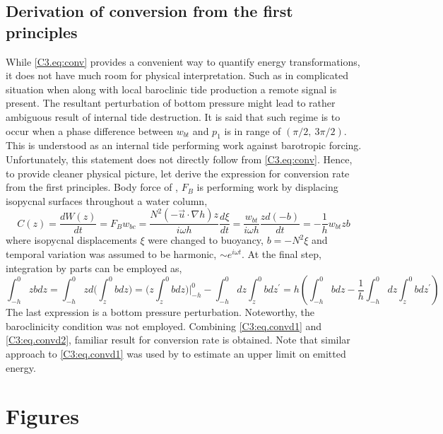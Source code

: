\documentclass[12pt]{article}
\begin{document}
\subsection{Derivation of conversion from the first principles}
\label{C3.app:B}
While \eqref{C3.eq:conv} provides a convenient way to quantify energy transformations, it does 
not have much room for physical interpretation. Such as in complicated situation when along with 
local baroclinic tide production a remote signal is present. The resultant perturbation of bottom 
pressure might lead to rather ambiguous result of internal tide destruction. It is said that such 
regime is to occur when a phase difference between $w_{bt}$ and $p_{1}$ is in range of 
$(\pi/2,~3\pi/2)$. This is understood as an internal tide performing work against barotropic 
forcing. Unfortunately, this statement does not directly follow from \eqref{C3.eq:conv}. Hence, to 
provide cleaner physical picture, let derive the expression for conversion rate from the first 
principles. Body force of \citep{baines1982internal}, $F_B$ is performing work by displacing 
isopycnal 
surfaces throughout a water column,
\begin{equation}
\label{C3:eq.convd1}
C(z) = \frac{dW(z)}{dt} = F_{B} w_{bc} = \frac{N^2 (-\vec{u} \cdot \nabla h) z}{i \omega h} 
\frac{d 
\xi}{dt} = \frac{w_{bt}}{i \omega h} \frac{z d(-b)}{dt} = -\frac{1}{h} w_{bt} zb
\end{equation}
where isopycnal displacements $\xi$ were changed to buoyancy, $b = -N^2 \xi$ and temporal 
variation 
was assumed to be harmonic, $\sim e^{i \omega t}$. At the final step, integration by parts can be 
employed as,
\begin{equation}
\label{C3:eq.convd2}
\int_{-h}^{0} z b dz = \int_{-h}^{0} z d \big( \int^0_{z} b dz \big) = \big( z \int^0_{z} b dz 
\big)\big|_{-h}^0 - \int_{-h}^{0} dz \int_{z}^{0} b dz^{\prime} = h (\int_{-h}^{0}b dz - 
\frac{1}{h} \int_{-h}^{0} dz \int_{z}^{0} b dz^{\prime})
\end{equation}
The last expression is a bottom pressure perturbation. Noteworthy, the baroclinicity condition was 
not employed. Combining \eqref{C3:eq.convd1} and \eqref{C3:eq.convd2}, familiar result 
for conversion rate is obtained. Note that similar approach to \eqref{C3:eq.convd1} was used 
by \citep{nash2006structure} to estimate an upper limit on emitted energy.\\

\newpage
\section{Figures}
\end{document}
